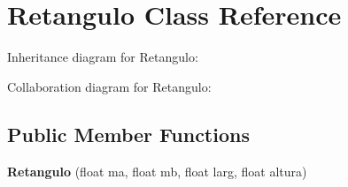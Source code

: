 \hypertarget{classRetangulo}{}\section{Retangulo Class Reference}
\label{classRetangulo}


Inheritance diagram for Retangulo\+:


Collaboration diagram for Retangulo\+:
\subsection*{Public Member Functions}
\begin{DoxyCompactItemize}
\item 
{\bfseries Retangulo} (float ma, float mb, float larg, float altura)\hypertarget{classRetangulo_a60d36f851f58647509794db661ab16d1}{}\label{classRetangulo_a60d36f851f58647509794db661ab16d1}


\end{DoxyCompactItemize}

